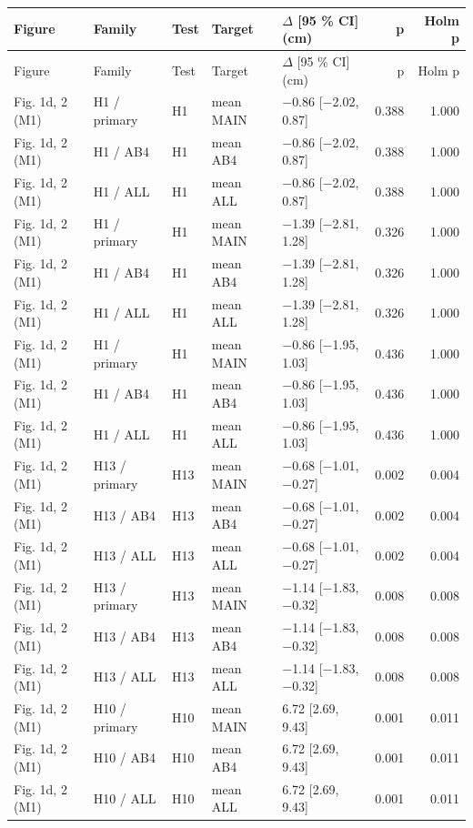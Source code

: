 \begin{longtable}{lllllrr}
\toprule
Figure & Family & Test & Target & $\Delta$ [95 \% CI] (cm) & p & Holm p \\
\midrule
\endfirsthead
\toprule
Figure & Family & Test & Target & $\Delta$ [95 \% CI] (cm) & p & Holm p \\
\midrule
\endhead
Fig. 1d, 2 (M1) & H1 / primary & H1 & mean MAIN & $-$0.86 [$-$2.02, 0.87] & 0.388 & 1.000 \\
Fig. 1d, 2 (M1) & H1 / AB4 & H1 & mean AB4 & $-$0.86 [$-$2.02, 0.87] & 0.388 & 1.000 \\
Fig. 1d, 2 (M1) & H1 / ALL & H1 & mean ALL & $-$0.86 [$-$2.02, 0.87] & 0.388 & 1.000 \\
Fig. 1d, 2 (M1) & H1 / primary & H1 & mean MAIN & $-$1.39 [$-$2.81, 1.28] & 0.326 & 1.000 \\
Fig. 1d, 2 (M1) & H1 / AB4 & H1 & mean AB4 & $-$1.39 [$-$2.81, 1.28] & 0.326 & 1.000 \\
Fig. 1d, 2 (M1) & H1 / ALL & H1 & mean ALL & $-$1.39 [$-$2.81, 1.28] & 0.326 & 1.000 \\
Fig. 1d, 2 (M1) & H1 / primary & H1 & mean MAIN & $-$0.86 [$-$1.95, 1.03] & 0.436 & 1.000 \\
Fig. 1d, 2 (M1) & H1 / AB4 & H1 & mean AB4 & $-$0.86 [$-$1.95, 1.03] & 0.436 & 1.000 \\
Fig. 1d, 2 (M1) & H1 / ALL & H1 & mean ALL & $-$0.86 [$-$1.95, 1.03] & 0.436 & 1.000 \\
Fig. 1d, 2 (M1) & H13 / primary & H13 & mean MAIN & $-$0.68 [$-$1.01, $-$0.27] & 0.002 & 0.004 \\
Fig. 1d, 2 (M1) & H13 / AB4 & H13 & mean AB4 & $-$0.68 [$-$1.01, $-$0.27] & 0.002 & 0.004 \\
Fig. 1d, 2 (M1) & H13 / ALL & H13 & mean ALL & $-$0.68 [$-$1.01, $-$0.27] & 0.002 & 0.004 \\
Fig. 1d, 2 (M1) & H13 / primary & H13 & mean MAIN & $-$1.14 [$-$1.83, $-$0.32] & 0.008 & 0.008 \\
Fig. 1d, 2 (M1) & H13 / AB4 & H13 & mean AB4 & $-$1.14 [$-$1.83, $-$0.32] & 0.008 & 0.008 \\
Fig. 1d, 2 (M1) & H13 / ALL & H13 & mean ALL & $-$1.14 [$-$1.83, $-$0.32] & 0.008 & 0.008 \\
Fig. 1d, 2 (M1) & H10 / primary & H10 & mean MAIN & 6.72 [2.69, 9.43] & 0.001 & 0.011 \\
Fig. 1d, 2 (M1) & H10 / AB4 & H10 & mean AB4 & 6.72 [2.69, 9.43] & 0.001 & 0.011 \\
Fig. 1d, 2 (M1) & H10 / ALL & H10 & mean ALL & 6.72 [2.69, 9.43] & 0.001 & 0.011 \\

\end{longtable}

